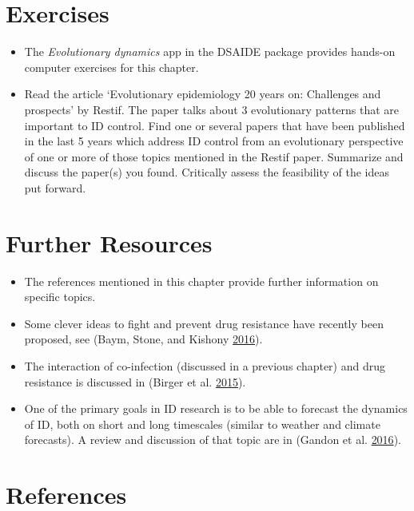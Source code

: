 \documentclass[]{book}
\providecommand{\tightlist}{%
  \setlength{\itemsep}{0pt}\setlength{\parskip}{0pt}}
\theoremstyle{definition}
\theoremstyle{definition}
\theoremstyle{definition}
\theoremstyle{remark}
\begin{document}
\section{Exercises}\label{exercises-13}

\begin{itemize}
\tightlist
\item
  The \emph{Evolutionary dynamics} app in the DSAIDE package provides
  hands-on computer exercises for this chapter.
\item
  Read the article `Evolutionary epidemiology 20 years on: Challenges
  and prospects' by Restif. The paper talks about 3 evolutionary
  patterns that are important to ID control. Find one or several papers
  that have been published in the last 5 years which address ID control
  from an evolutionary perspective of one or more of those topics
  mentioned in the Restif paper. Summarize and discuss the paper(s) you
  found. Critically assess the feasibility of the ideas put forward.
\end{itemize}

\section{Further Resources}\label{further-resources-13}

\begin{itemize}
\tightlist
\item
  The references mentioned in this chapter provide further information
  on specific topics.
\item
  Some clever ideas to fight and prevent drug resistance have recently
  been proposed, see (Baym, Stone, and Kishony
  \protect\hyperlink{ref-baym16}{2016}).
\item
  The interaction of co-infection (discussed in a previous chapter) and
  drug resistance is discussed in (Birger et al.
  \protect\hyperlink{ref-birger15}{2015}).
\item
  One of the primary goals in ID research is to be able to forecast the
  dynamics of ID, both on short and long timescales (similar to weather
  and climate forecasts). A review and discussion of that topic are in
  (Gandon et al. \protect\hyperlink{ref-gandon16}{2016}).
\end{itemize}

\section{References}\label{references-14}
\end{document}
